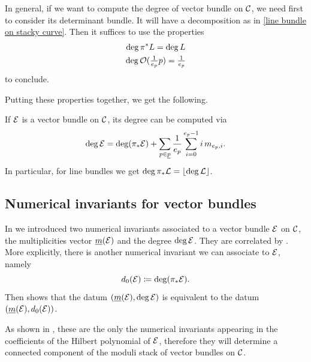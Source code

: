 In general, if we want to compute the degree of vector bundle on $\mathcal{C}$, we need first to consider its determinant bundle. It will have a decomposition as in \eqref{line bundle on stacky curve}. Then it suffices to use the properties
\begin{gather}
\deg \pi^* L = \deg L \\
\deg \mathcal{O}(\tfrac{1}{e_p}p) = \tfrac{1}{e_p}
\end{gather}
to conclude.

Putting these properties together, we get the following.

\begin{prop}\cite[Theorem 1.2.30]{Taams}
If $\mathcal{E}$ is a vector bundle on $\mathcal{C}$, its degree can be computed via
\begin{equation}\label{formula degree-multiplicities}
\deg \mathcal{E} = \deg(\pi_* \mathcal{E}) + \sum_{p \in \underline{p}} \frac{1}{e_p} \sum_{i=0}^{e_p -1} i \, m_{e_p, i}.
\end{equation}
In particular, for line bundles we get $\deg \pi_*\mathcal{L} = \lfloor\deg \mathcal{L} \rfloor$.
\end{prop}

\subsection{Numerical invariants for vector bundles} \label{subsection: numerical invariants for vector bundles}

In  we introduced two numerical invariants associated to a vector bundle $\mathcal{E}$ on $\mathcal{C}$, the multiplicities vector $\underline{m}(\mathcal{E})$ and the degree $\deg \mathcal{E}$. They are correlated by . More explicitly, there is another numerical invariant we can associate to $\mathcal{E}$, namely
\begin{equation} \label{d_0 def}
d_0(\mathcal{E}) \coloneqq \deg(\pi_* \mathcal{E}).
\end{equation}
Then  shows that the datum $(\underline{m}(\mathcal{E}), \deg \mathcal{E})$ is equivalent to the datum $(\underline{m}(\mathcal{E}), d_0(\mathcal{E}))$.

As shown in \cite[Section 1.3]{Taams}, these are the only the numerical invariants appearing in the coefficients of the Hilbert polynomial of $\mathcal{E}$, therefore they will determine a connected component of the moduli stack of vector bundles on $\mathcal{C}$.

